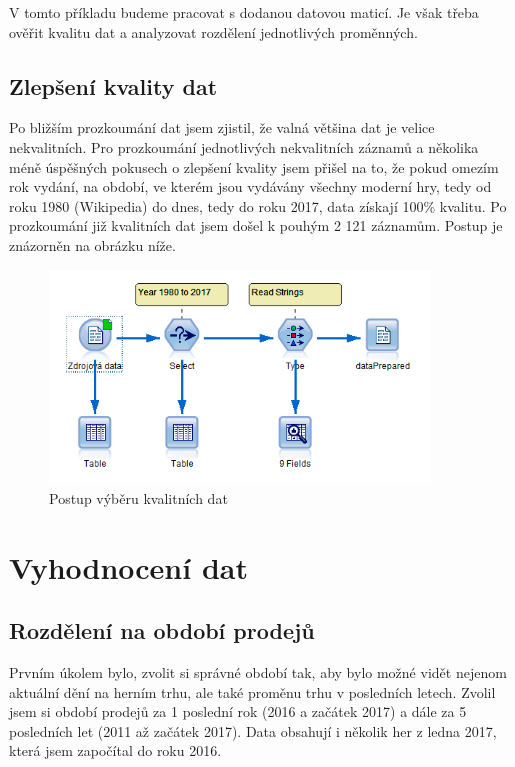 \documentclass[FM,ZP]{tulthesis}
\begin{document}
V tomto příkladu budeme pracovat s dodanou datovou maticí. Je však třeba ověřit kvalitu dat a analyzovat rozdělení jednotlivých proměnných.

\section{Zlepšení kvality dat}
Po bližším prozkoumání dat jsem zjistil, že valná většina dat je velice nekvalitních. Pro prozkoumání jednotlivých nekvalitních záznamů a několika méně úspěšných pokusech o zlepšení kvality jsem přišel na to, že pokud omezím rok vydání, na období, ve kterém jsou vydávány všechny moderní hry, tedy od roku 1980 (Wikipedia) do dnes, tedy do roku 2017, data získají 100\% kvalitu. Po prozkoumání již kvalitních dat jsem došel k pouhým 2 121 záznamům. Postup je znázorněn na obrázku níže.

\begin{figure}[H]
\begin{center}
\includegraphics[width=0.9\textwidth]{images/dataPreparation.png}
\caption{Postup výběru kvalitních dat}
\label{image}
\end{center}
\end{figure}

\chapter{Vyhodnocení dat}

\section{Rozdělení na období prodejů}
Prvním úkolem bylo, zvolit si správné období tak, aby bylo možné vidět nejenom aktuální dění na herním trhu, ale také proměnu trhu v posledních letech. Zvolil jsem si období prodejů za 1 poslední rok (2016 a začátek 2017) a dále za 5 posledních let (2011 až začátek 2017). Data obsahují i několik her z ledna 2017, která jsem započítal do roku 2016.
\end{document}
